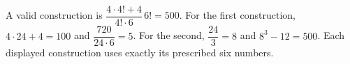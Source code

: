 A valid construction is $\boxed{\dfrac{4\cdot4!+4}{4!\cdot6}\,6!=500}$. For the first construction, $4\cdot24+4=100$ and $\dfrac{720}{24\cdot6}=5$. For the second, $\dfrac{24}{3}=8$ and $8^3-12=500$. Each displayed construction uses exactly its prescribed six numbers.
